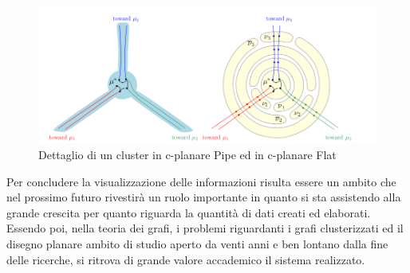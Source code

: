 {\begin{figure}[!htb]
	\begin{center}
		\includegraphics[width=1 \linewidth]{figure/flatVsPipe}
	\end{center}
	\caption{Dettaglio di un cluster in c-planare Pipe ed in c-planare Flat \label{fig:flatVsPipe}}
\end{figure}

Per concludere la visualizzazione delle informazioni risulta essere un ambito che nel prossimo futuro rivestirà un ruolo importante in quanto si sta assistendo alla grande crescita per quanto riguarda la quantità di dati creati ed elaborati. Essendo poi, nella teoria dei grafi, i problemi riguardanti i grafi clusterizzati ed il disegno planare ambito di studio aperto da venti anni e ben lontano dalla fine delle ricerche, si ritrova di grande valore accademico il sistema realizzato. 
}
